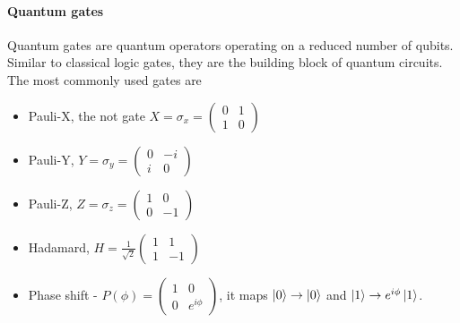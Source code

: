 \paragraph{Quantum gates}
Quantum gates are quantum operators operating on a reduced number of qubits. Similar to classical logic gates, they are the building block of quantum circuits. The most commonly used gates are 
\begin{itemize}
  \item Pauli-X, the not gate $X=\sigma_x=\begin{pmatrix}0 & 1 \\ 1 & 0 \end{pmatrix}$
  \item Pauli-Y, $Y=\sigma_y=\begin{pmatrix}0 & -i \\ i & 0 \end{pmatrix}$
  \item Pauli-Z, $Z=\sigma_z=\begin{pmatrix}1 & 0 \\ 0 & -1 \end{pmatrix}$
  \item Hadamard, $H=\frac{1}{\sqrt{2}}\begin{pmatrix}1 & 1 \\ 1 & -1 \end{pmatrix}$
  \item Phase shift - $P(\phi)=\begin{pmatrix}1 & 0 \\ 0 & e^{i\phi} \end{pmatrix}$, it maps $\ket{0}\rightarrow \ket{0}$ and $\ket{1}\rightarrow e^{i\phi}\ket{1}$.
\end{itemize}
